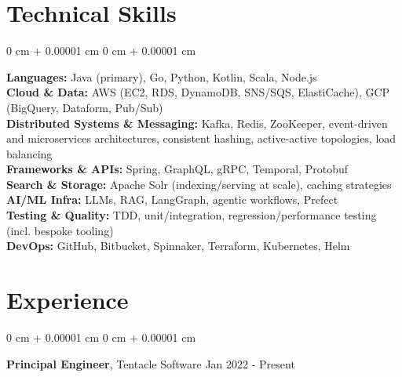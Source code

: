 \documentclass[10pt, letterpaper]{article}
\newenvironment{onecolentry}{
    \begin{adjustwidth}{
        0 cm + 0.00001 cm
    }{
        0 cm + 0.00001 cm
    }
}{
    \end{adjustwidth}
} %
\newenvironment{twocolentry}[2][]{
    \onecolentry
    \def\secondColumn{#2}
    \setcolumnwidth{\fill, 4.5 cm}
    \begin{paracol}{2}
}{
    \switchcolumn \raggedleft \secondColumn
    \end{paracol}
    \endonecolentry
} %
\begin{document}
    \section{Technical Skills}
        \begin{onecolentry}
            \textbf{Languages:} Java (primary), Go, Python, Kotlin, Scala, Node.js \\
            \textbf{Cloud \& Data:} AWS (EC2, RDS, DynamoDB, SNS/SQS, ElastiCache), GCP (BigQuery, Dataform, Pub/Sub) \\
            \textbf{Distributed Systems \& Messaging:} Kafka, Redis, ZooKeeper, event-driven and microservices architectures, consistent hashing, active-active topologies, load balancing \\
            \textbf{Frameworks \& APIs:} Spring, GraphQL, gRPC, Temporal, Protobuf \\
            \textbf{Search \& Storage:} Apache Solr (indexing/serving at scale), caching strategies \\
            \textbf{AI/ML Infra:} LLMs, RAG, LangGraph, agentic workflows, Prefect \\
            \textbf{Testing \& Quality:} TDD, unit/integration, regression/performance testing (incl. bespoke tooling) \\
            \textbf{DevOps:} GitHub, Bitbucket, Spinnaker, Terraform, Kubernetes, Helm \\
        \end{onecolentry}
    
    \section{Experience}
        \vspace{0.15 cm}
        \begin{twocolentry}{
            Jan 2022 - Present
        }
        \textbf{Principal Engineer}, Tentacle Software\end{twocolentry}
\end{document}
